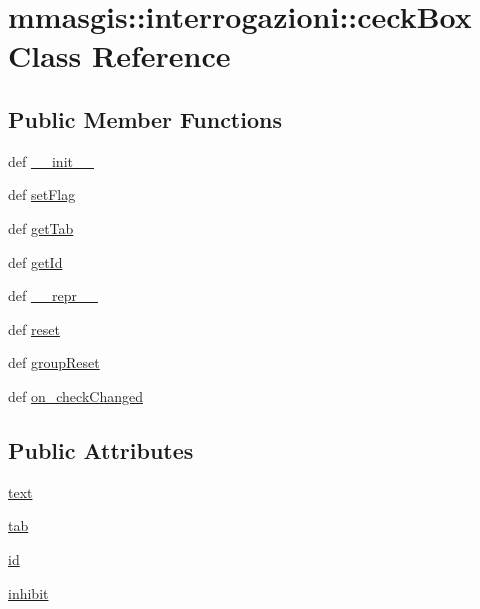 \hypertarget{classmmasgis_1_1interrogazioni_1_1ceckBox}{
\section{mmasgis::interrogazioni::ceckBox Class Reference}
\label{classmmasgis_1_1interrogazioni_1_1ceckBox}
}
\subsection*{Public Member Functions}
\begin{DoxyCompactItemize}
\item 
def \hyperlink{classmmasgis_1_1interrogazioni_1_1ceckBox_a4ad12bf96dcf43d29fec9103708ca9bb}{\_\-\_\-init\_\-\_\-}
\item 
def \hyperlink{classmmasgis_1_1interrogazioni_1_1ceckBox_a901db1aed1ebace835b081f31190d1f1}{setFlag}
\item 
def \hyperlink{classmmasgis_1_1interrogazioni_1_1ceckBox_a56b0497920c0ec0716d5db9d96ee17a9}{getTab}
\item 
def \hyperlink{classmmasgis_1_1interrogazioni_1_1ceckBox_a0c6feba21cdbb5b39e4f211bdd1356ff}{getId}
\item 
def \hyperlink{classmmasgis_1_1interrogazioni_1_1ceckBox_aba97c203e1daaddc5e859ccaecafb45e}{\_\-\_\-repr\_\-\_\-}
\item 
def \hyperlink{classmmasgis_1_1interrogazioni_1_1ceckBox_a2e25aa5b5b1ba219753819826d4803d6}{reset}
\item 
def \hyperlink{classmmasgis_1_1interrogazioni_1_1ceckBox_adcecdf60436c643f9c619a1bb5d3dae6}{groupReset}
\item 
def \hyperlink{classmmasgis_1_1interrogazioni_1_1ceckBox_a5d174149b97215412767e8c5b6b93940}{on\_\-checkChanged}
\end{DoxyCompactItemize}
\subsection*{Public Attributes}
\begin{DoxyCompactItemize}
\item 
\hyperlink{classmmasgis_1_1interrogazioni_1_1ceckBox_af14c61cad705cffca236274c794b8575}{text}
\item 
\hyperlink{classmmasgis_1_1interrogazioni_1_1ceckBox_ae0a2c99b7e1ef3245ab5c1162154499b}{tab}
\item 
\hyperlink{classmmasgis_1_1interrogazioni_1_1ceckBox_a0251045e13908d29a06d566b97c5d1a5}{id}
\item 
\hyperlink{classmmasgis_1_1interrogazioni_1_1ceckBox_af063e5f8e933d5a0630703dd3713c915}{inhibit}
\end{DoxyCompactItemize}


